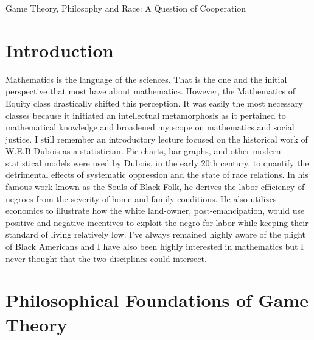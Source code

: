 \documentclass[12pt,twoside]{article}
\begin{document}

\begin{center}
{\large Game Theory, Philosophy and Race: A Question of Cooperation}
\end{center}


\newpage
\section{Introduction}

\noindent Mathematics is the language of the sciences. That is the one and the initial perspective that most have about mathematics. However, the Mathematics of Equity class drastically shifted this perception. It was easily the most necessary classes because it initiated an intellectual metamorphosis as it pertained to mathematical knowledge and broadened my scope on mathematics and social justice. I still remember an introductory lecture focused on the  historical work of W.E.B Dubois as a statistician. Pie charts, bar graphs, and other modern statistical models were used by Dubois, in the early 20th century, to quantify the detrimental effects of systematic oppression and the state of race relations. In his famous work known as the Souls of Black Folk, he derives the labor efficiency of negroes from the severity of home and family conditions. He also utilizes economics to illustrate how the white land-owner, post-emancipation, would use positive and negative incentives to exploit the negro for labor while keeping their standard of living relatively low. I’ve always remained highly aware of the plight of Black Americans and I have also been highly interested in mathematics but I never thought that the two disciplines could intersect. 


\section{Philosophical Foundations of Game Theory}
\end{document}
